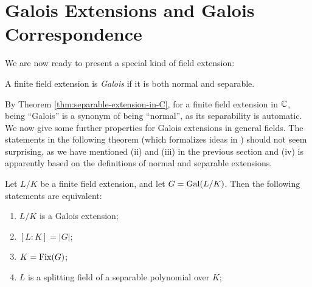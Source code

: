 \section{Galois Extensions and Galois Correspondence}



We are now ready to present a special kind of field extension:

\begin{definition}
    A finite field extension is \textit{Galois} if it is both normal and separable. 
\end{definition}

By Theorem \ref{thm:separable-extension-in-C}, for a finite field extension in $\mathbb C$, being ``Galois'' is a synonym of being ``normal'', as its separability is automatic. 
We now give some further properties for Galois extensions in general fields. The statements in the following theorem (which formalizes ideas in \cite{galois-theory-lectures}) should not seem surprising, as we have mentioned (ii) and (iii) in the previous section and (iv) is apparently based on the definitions of normal and separable extensions. 


\begin{theorem} \label{thm:fixed}
	Let $L/K$ be a finite field extension, and let $G = \operatorname{Gal}(L/K)$. Then the following statements are equivalent:
	\begin{enumerate}[label=(\roman*)]
		\item $L/K$ is a Galois extension;
		\item $[L:K] = |G|$;
		\item $K = \operatorname{Fix}(G)$;
		\item $L$ is a splitting field of a separable polynomial over $K$;
	\end{enumerate}
\end{theorem}


